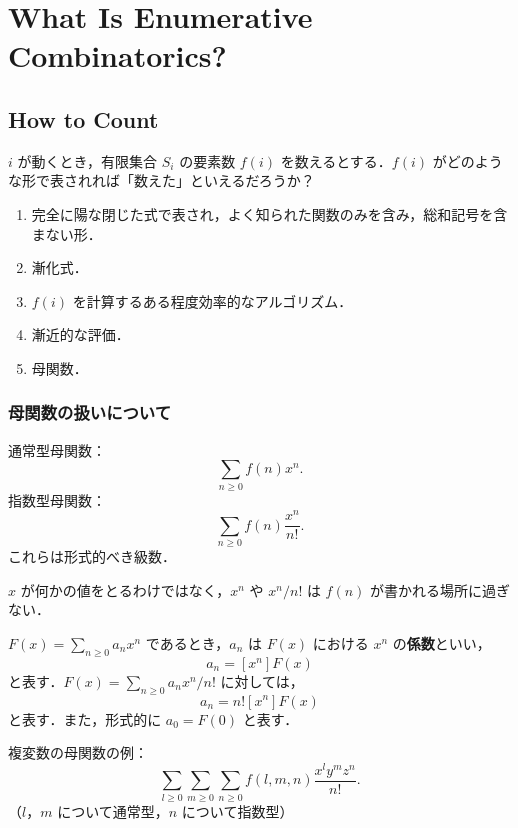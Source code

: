 \documentclass[xelatex,ja=standard,a4paper,14pt]{bxjsarticle}
\theoremstyle{definition}
\begin{document}
\section{What Is Enumerative Combinatorics?}
\subsection{How to Count}

$i$ が動くとき，有限集合 $S_i$ の要素数 $f(i)$ を数えるとする．$f(i)$ がどのような形で表されれば「数えた」といえるだろうか？

\begin{enumerate}[1.]
    \item 完全に陽な閉じた式で表され，よく知られた関数のみを含み，総和記号を含まない形．
    \item 漸化式．
    \item $f(i)$ を計算するある程度効率的なアルゴリズム．
    \item 漸近的な評価．
    \item 母関数．
\end{enumerate}

\subsubsection{母関数の扱いについて}

通常型母関数： \begin{equation*}
    \sum_{n \geq 0} f(n) x^n.
\end{equation*}
指数型母関数： \begin{equation*}
    \sum_{n \geq 0} f(n) \frac{x^n}{n!}.
\end{equation*}
これらは形式的べき級数．

$x$ が何かの値をとるわけではなく，$x^n$ や $x^n/n!$ は $f(n)$ が書かれる場所に過ぎない．

$F(x) = \sum_{n \geq 0} a_n x^n$ であるとき，$a_n$ は $F(x)$ における $x^n$ の\textbf{係数}といい， \begin{equation*}
    a_n = [x^n] F(x)
\end{equation*}
と表す．$F(x) = \sum_{n \geq 0} a_n x^n/n!$ に対しては， \begin{equation*}
    a_n = n! [x^n] F(x)
\end{equation*}
と表す．また，形式的に $a_0 = F(0)$ と表す．

複変数の母関数の例： \begin{equation*}
    \sum_{l \geq 0} \sum_{m \geq 0} \sum_{n \geq 0} f(l,m,n) \frac{x^ly^mz^n}{n!}.
\end{equation*}
（$l$，$m$ について通常型，$n$ について指数型）
\end{document}
